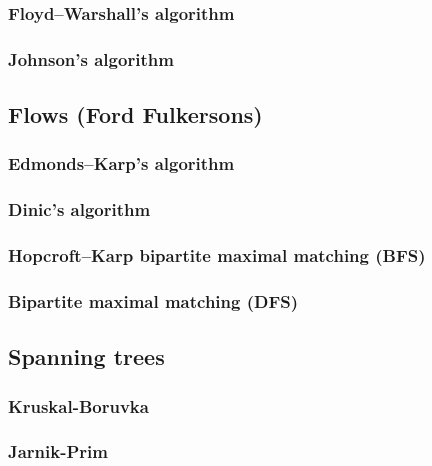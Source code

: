 \documentclass[a4paper]{article}
\begin{document}
        \subsubsection{Floyd--Warshall's algorithm}
            
        \subsubsection{Johnson's algorithm}
            
    
    \subsection{Flows (Ford Fulkersons)}
        \subsubsection{Edmonds--Karp's algorithm}
            
        \subsubsection{Dinic's algorithm}
            
        \subsubsection{Hopcroft–Karp bipartite maximal matching (BFS)}
            
        \subsubsection{Bipartite maximal matching (DFS)}
            

    \subsection{Spanning trees}
        \subsubsection{Kruskal-Boruvka}
            
        \subsubsection{Jarnik-Prim}
            
\end{document}
